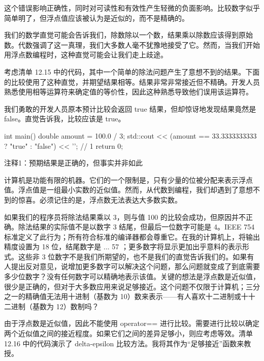 这个错误影响正确性，同时对可读性和有效性产生轻微的负面影响。比较数字似乎简单明了，但浮点值应该被认为是近似的，而不是精确的。


我们的数学直觉可能会告诉我们，除数除以一个数，结果乘以除数应该得到原始数。代数强调了这一真理，我们大多数人毫不犹豫地接受了它。然而，当我们开始用浮点数编程时，这种直觉可能会让我们走上歧途。

考虑清单 12.15 中的代码，其中一个简单的除法问题产生了意想不到的结果。下面的比较使用了这种直觉，并期望结果相等。结果非常非常接近但不精确。开发人员熟悉使用相等运算符来确定值的等价性，因此这种熟悉导致他们误用该运算符。

我们勇敢的开发人员原本预计比较会返回 true 结果，但却惊讶地发现结果竟然是 false。直觉告诉我，比较应该是 true。


\begin{cpp}
int main() {
  double amount = 100.0 / 3;
  std::cout << (amount == 33.3333333333 ? "true" : "false") << '\n'; // 1
  return 0;
}
\end{cpp}

{\footnotesize
注释1：预期结果是正确的，但事实并非如此
}


计算机是功能有限的机器。它们的一个限制是，只有少量的位被分配来表示浮点值。浮点值是一组最小实数的近似值。然而，从代数到编程，我们却遇到了意想不到的惊喜。必须记住的是，浮点数无法表达大多数实数。

如果我们的程序员将除法结果乘以 3，则与值 100 的比较会成功，但原因并不正确。除法结果的实际值不是以数字 3 结尾，但最后一位数字可能是 4。IEEE 754 标准定义了此行为；所有符合标准的编译器都会尊重它。在我的计算机上，将输出精度设置为 18 位，结尾数字是 ... 57 ；更多数字将显示更加出乎意料的表示形式。这些非 3 位数字不是我们所期望的，也不是我们的直觉告诉我们的。如果有人提出反对意见，说增加更多数字可以解决这个问题，那么问题就变成了到底需要多少位数字？没有任何数字可以精确地表示该值。关键的想法是浮点数是近似值，很少是正确的，但对于大多数应用来说足够接近。这个问题不仅限于计算机；三分之一的精确值无法用十进制（基数为 10）数来表示——有人喜欢十二进制或十十二进制（基数为 12）数制吗？


由于浮点数是近似值，因此不能使用 operator== 进行比较。需要进行比较以确定两个近似值之间的接近程度。如果它们之间的差异足够小，则应考虑等效。清单 12.16 中的代码演示了 delta-epsilon 比较方法。我将其作为“足够接近”函数来教授。

